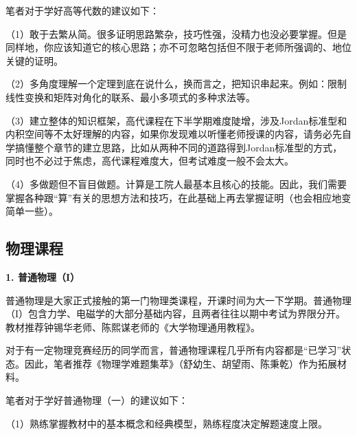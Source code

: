 \vspace{10pt}

笔者对于学好高等代数的建议如下：

\vspace{10pt}

（1）敢于去繁从简。很多证明思路繁杂，技巧性强，没精力也没必要掌握。但是同样地，你应该知道它的核心思路；亦不可忽略包括但不限于老师所强调的、地位关键的证明。

\vspace{10pt}

（2）多角度理解一个定理到底在说什么，换而言之，把知识串起来。例如：限制线性变换和矩阵对角化的联系、最小多项式的多种求法等。

\vspace{10pt}

（3）建立整体的知识框架，高代课程在下半学期难度陡增，涉及Jordan标准型和内积空间等不太好理解的内容，如果你发现难以听懂老师授课的内容，请务必先自学搞懂整个章节的建立思路，比如从两种不同的道路得到Jordan标准型的方式，同时也不必过于焦虑，高代课程难度大，但考试难度一般不会太大。

\vspace{10pt}

（4）多做题但不盲目做题。计算是工院人最基本且核心的技能。因此，我们需要掌握各种跟“算”有关的思想方法和技巧，在此基础上再去掌握证明（也会相应地变简单一些）。

\vspace{10pt}

\subsection{物理课程}
\textbf{1. 普通物理（I）}

普通物理是大家正式接触的第一门物理类课程，开课时间为大一下学期。普通物理（I）包含力学、电磁学的大部分基础内容，且两者往往以期中考试为界限分开。教材推荐钟锡华老师、陈熙谋老师的《大学物理通用教程》。

\vspace{10pt}

对于有一定物理竞赛经历的同学而言，普通物理课程几乎所有内容都是“已学习”状态。因此，笔者推荐《物理学难题集萃》（舒幼生、胡望雨、陈秉乾）作为拓展材料。

\vspace{10pt}

笔者对于学好普通物理（一）的建议如下：

\vspace{10pt}

（1）熟练掌握教材中的基本概念和经典模型，熟练程度决定解题速度上限。

